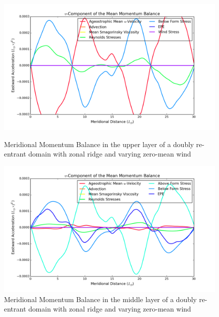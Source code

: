 \documentclass[12pt,a4paper]{report}
\begin{document}
 \begin{figure}
 	\centering
 	\begin{minipage}[b]{0.45\linewidth}
 		\centering
 		\includegraphics[width=\linewidth ]{vmom_3}
 		\caption{Meridional Momentum Balance in the upper layer of 
 			a doubly re-entrant domain with 
 			zonal ridge and varying zero-mean wind}
 		\label{fig:vmomlayer3}
 	\end{minipage}
 	\quad
 	\begin{minipage}[b]{0.45\linewidth}
 		\centering
 		\includegraphics[width=\linewidth ]{vmom_2}
 		\caption{Meridional Momentum Balance in the middle layer of 
 			a doubly re-entrant domain with 
 			zonal ridge and varying zero-mean wind}
 		\label{fig:vmomlayer2}
 	\end{minipage}
 \end{figure}
 
\end{document}
